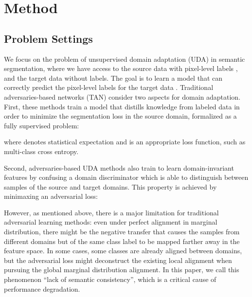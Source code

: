 \documentclass[10pt,twocolumn,letterpaper]{article}
\begin{document}
\section{Method}


\subsection{Problem Settings} \label{Problem setting}
We focus on the problem of unsupervised domain adaptation (UDA) in semantic segmentation, where we have access to the source data  with pixel-level labels , and the target data  without labels. The goal is to learn a model  that can correctly predict the pixel-level labels for the target data . Traditional adversaries-based networks (TAN) consider two aspects for domain adaptation. First, these methods train a model  that distills knowledge from labeled data in order to minimize the segmentation loss in the source domain, formalized as a fully supervised problem:


where  denotes statistical expectation and  is an appropriate loss function, such as multi-class cross entropy.

Second, adversaries-based UDA methods also train  to learn domain-invariant features by confusing a domain discriminator  which is able to distinguish between samples of the source and target domains. This property is achieved by minimaxing an adversarial loss:



However, as mentioned above, there is a major limitation for traditional adversarial learning methods: even under perfect alignment in marginal distribution, there might be the negative transfer that causes the samples from different domains but of the same class label to be mapped farther away in the feature space. In some cases, some classes are already aligned between domains, but the adversarial loss might deconstruct the existing local alignment when pursuing the global marginal distribution alignment. In this paper, we call this phenomenon ``lack of  semantic consistency'', which is a critical cause of performance degradation. 
\end{document}
